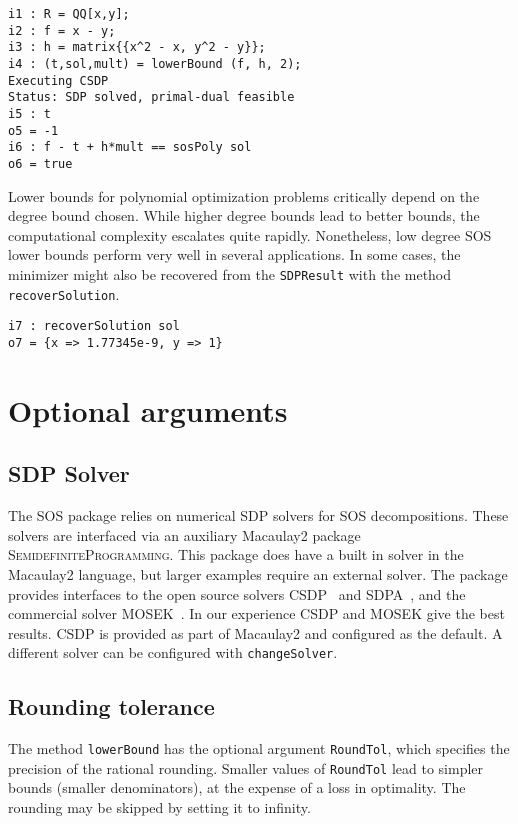 \documentclass[11pt]{amsart}
\theoremstyle{plain}%
\theoremstyle{definition}
\theoremstyle{remark}
\newcommand{\Mac}{Macaulay2\xspace}
\newcommand{\SOS}{\textsc{SOS}\xspace}
\newcommand{\SDP}{\textsc{SemidefiniteProgramming}\xspace}
\begin{document}
{\small
\begin{verbatim}
i1 : R = QQ[x,y];
i2 : f = x - y;
i3 : h = matrix{{x^2 - x, y^2 - y}};
i4 : (t,sol,mult) = lowerBound (f, h, 2);
Executing CSDP
Status: SDP solved, primal-dual feasible
i5 : t
o5 = -1
i6 : f - t + h*mult == sosPoly sol
o6 = true
\end{verbatim}
}

Lower bounds for polynomial optimization problems critically depend on the degree bound chosen.
While higher degree bounds lead to better bounds, the computational complexity escalates quite rapidly.
Nonetheless, low degree SOS lower bounds perform very well in several applications.
In some cases, the minimizer might also be recovered from the \verb|SDPResult| with the method \verb|recoverSolution|.

{\small
\begin{verbatim}
i7 : recoverSolution sol
o7 = {x => 1.77345e-9, y => 1}
\end{verbatim}
}

\section{Optional arguments}
\label{s:arguments}

\subsection*{SDP Solver}
The \SOS package relies on numerical SDP solvers for SOS decompositions.
These solvers are interfaced via an auxiliary Macaulay2 package \SDP.
This package does have a built in solver in the \Mac language, but larger examples require an external solver.
The package provides interfaces to the open source solvers CSDP~\cite{borchers1999csdp} and SDPA~\cite{yamashita2003implementation}, and the commercial solver MOSEK~\cite{mosek}.
In our experience CSDP and MOSEK give the best results.
CSDP is provided as part of \Mac and configured as the default.
A different solver can be configured with \verb|changeSolver|.

\subsection*{Rounding tolerance}
The method \verb|lowerBound| has the optional argument \verb|RoundTol|, which specifies the precision of the rational rounding.
Smaller values of \verb|RoundTol| lead to simpler bounds (smaller denominators), at the expense of a loss in optimality.
The rounding may be skipped by setting it to infinity.
\end{document}
